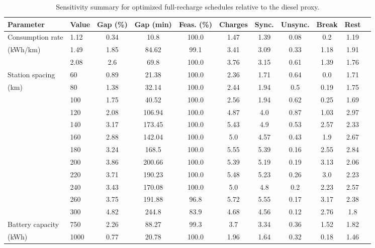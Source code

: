 \begin{table}[t]
\centering
\caption{Sensitivity summary for optimized full-recharge schedules relative to the diesel proxy.}
\label{tab:sensitivity_full_diesel}
\begin{threeparttable}
\small
\setlength{\tabcolsep}{3.5pt}
\renewcommand{\arraystretch}{1.1}
\begin{tabular}{
ll
S[table-format=1.2]
S[table-format=3.0]
S[table-format=3.1]
S[table-format=1.2]
S[table-format=1.2]
S[table-format=1.2]
S[table-format=1.2]
S[table-format=1.2]
S[table-format=1.2]
}
\toprule
Parameter & Value & {Gap (\%)} & {Gap (min)} & {Feas. (\%)} & {Charges} & {Sync.} & {Unsync.} & {Break} & {Rest} \\
\midrule
Consumption rate & 1.12 & 0.34 & 10.8 & 100.0 & 1.47 & 1.39 & 0.08 & 0.2 & 1.19 \\
(kWh/km) & 1.49 & 1.85 & 84.62 & 99.1 & 3.41 & 3.09 & 0.33 & 1.18 & 1.91 \\
 & 2.08 & 2.6 & 69.8 & 100.0 & 3.76 & 3.15 & 0.61 & 1.39 & 1.76 \\
\addlinespace
Station spacing & 60 & 0.89 & 21.38 & 100.0 & 2.36 & 1.71 & 0.64 & 0.0 & 1.71 \\
(km) & 80 & 1.38 & 32.14 & 100.0 & 2.44 & 1.94 & 0.5 & 0.19 & 1.75 \\
 & 100 & 1.75 & 40.52 & 100.0 & 2.56 & 1.94 & 0.62 & 0.25 & 1.69 \\
 & 120 & 2.08 & 106.94 & 100.0 & 4.87 & 4.0 & 0.87 & 1.03 & 2.97 \\
 & 140 & 3.17 & 173.45 & 100.0 & 5.43 & 4.9 & 0.53 & 2.57 & 2.33 \\
 & 160 & 2.88 & 142.04 & 100.0 & 5.0 & 4.57 & 0.43 & 1.9 & 2.67 \\
 & 180 & 3.24 & 168.5 & 100.0 & 5.55 & 5.39 & 0.16 & 2.55 & 2.84 \\
 & 200 & 3.86 & 200.66 & 100.0 & 5.39 & 5.19 & 0.19 & 3.13 & 2.06 \\
 & 220 & 3.71 & 190.23 & 100.0 & 5.48 & 5.23 & 0.26 & 3.0 & 2.23 \\
 & 240 & 3.43 & 170.08 & 100.0 & 5.0 & 4.8 & 0.2 & 2.23 & 2.57 \\
 & 260 & 3.75 & 191.88 & 96.8 & 5.72 & 5.55 & 0.17 & 3.17 & 2.38 \\
 & 300 & 4.82 & 244.8 & 83.9 & 4.68 & 4.56 & 0.12 & 2.76 & 1.8 \\
\addlinespace
Battery capacity & 750 & 2.26 & 88.27 & 99.3 & 3.7 & 3.34 & 0.36 & 1.52 & 1.82 \\
(kWh) & 1000 & 0.77 & 20.78 & 100.0 & 1.96 & 1.64 & 0.32 & 0.18 & 1.46 \\

\end{tabular}
\end{threeparttable}
\end{table}
